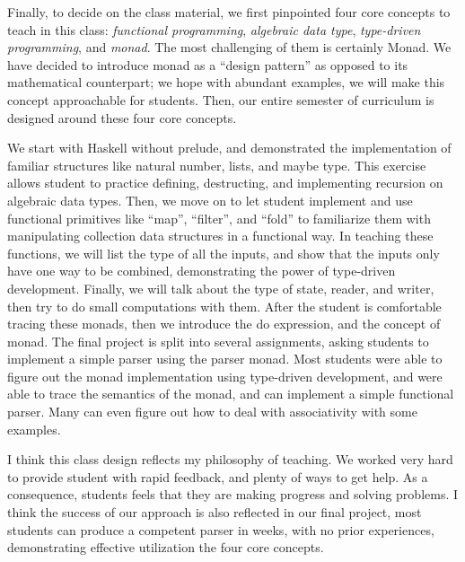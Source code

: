 \documentclass[11pt,a4paper,sans]{moderncv} %
\begin{document}
Finally, to decide on the class material, we first pinpointed four core concepts to teach in this class: \emph{functional programming}, \emph{algebraic data type}, \emph{type-driven programming}, and \emph{monad}.
The most challenging of them is certainly Monad. 
We have decided to introduce monad as a ``design pattern'' as opposed to its mathematical counterpart; we hope with abundant examples, we will make this concept approachable for students.
Then, our entire semester of curriculum is designed around these four core concepts.

We start with Haskell without prelude, and demonstrated the implementation of familiar structures like natural number, lists, and maybe type.
This exercise allows student to practice defining, destructing, and implementing recursion on algebraic data types.
Then, we move on to let student implement and use functional primitives like ``map'', ``filter'', and ``fold'' to familiarize them with manipulating collection data structures in a functional way.
In teaching these functions, we will list the type of all the inputs, and show that the inputs only have one way to be combined, demonstrating the power of type-driven development.
Finally, we will talk about the type of state, reader, and writer, then try to do small computations with them.
After the student is comfortable tracing these monads, then we introduce the do expression, and the concept of monad.
The final project is split into several assignments, asking students to implement a simple parser using the parser monad.
Most students were able to figure out the monad implementation using type-driven development, and were able to trace the semantics of the monad, and can implement a simple functional parser. 
Many can even figure out how to deal with associativity with some examples.

I think this class design reflects my philosophy of teaching. We worked very hard to provide student with rapid feedback, and plenty of ways to get help. 
As a consequence, students feels that they are making progress and solving problems. 
I think the success of our approach is also reflected in our final project, most students can produce a competent parser in weeks, with no prior experiences, demonstrating effective utilization the four core concepts.

\newpage
\printbibliography %
\end{document}
